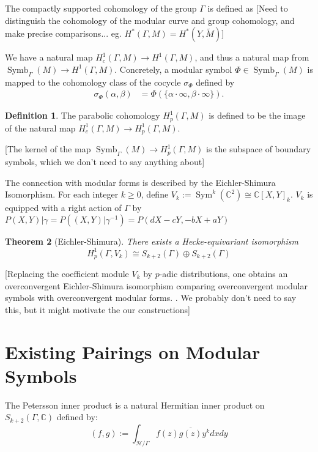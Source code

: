 \documentclass[10pt]{amsart}
\theoremstyle{plain}
\newtheorem{theorem}{Theorem}[section]
\theoremstyle{definition}
\newtheorem{definition}[theorem]{Definition}
\newcommand{\CC}{{\mathbb{C}}}
\newcommand{\cH}{\mathcal{H}}
\DeclareMathOperator{\Sym}{Sym}
\DeclareMathOperator{\Symb}{Symb}
\begin{document}
The compactly supported cohomology of the group $\Gamma$ is defined as 
[Need to distinguish the cohomology of the modular curve and group cohomology, and make precise comparisons... eg. $H^*(\Gamma, M) = H^*(Y, \widetilde{M})$]



We have a natural map $H^1_c(\Gamma, M)\longrightarrow H^1(\Gamma,M)$, and thus a natural map from $\Symb_\Gamma(M)\longrightarrow H^1(\Gamma,M)$. Concretely, a modular symbol $\Phi\in \Symb_\Gamma(M)$ is mapped to the cohomology class of the cocycle $\sigma_\Phi$ defined by
\begin{align*}
\sigma_{\Phi}(\alpha, \beta) &= \Phi(\{\alpha \cdot \infty, \beta \cdot \infty\}).%
\end{align*}
\begin{definition}
The parabolic cohomology $H^1_p(\Gamma,M)$ is defined to be the image of the natural map $H^1_c(\Gamma,M)\longrightarrow H^1_p(\Gamma,M)$.
\end{definition}
[The kernel of the map $\Symb_\Gamma(M)\longrightarrow H^1_p(\Gamma,M)$ is the subspace of boundary symbols, which we don't need to say anything about]

The connection with modular forms is described by the Eichler-Shimura Isomorphism. For each integer $k\geq 0$, define $V_k:=\Sym^k(\CC^2)\cong \CC[X,Y]_k$. $V_k$ is equipped with a right action of $\Gamma$ by $P(X,Y)|\gamma =P((X,Y)|\gamma^{-1})=P(dX-cY,-bX+aY)$ %
\begin{theorem}[Eichler-Shimura]
There exists a Hecke-equivariant isomorphism
\begin{equation*}
	H^1_p(\Gamma, V_k) \cong S_{k+2}(\Gamma)\oplus \overline{S_{k+2}(\Gamma)}
\end{equation*}
\end{theorem}

[Replacing the coefficient module $V_k$ by $p$-adic distributions, one obtains an overconvergent Eichler-Shimura isomorphism comparing overconvergent modular symbols with overconvergent modular forms. \cite{Andreatta, Iovita, Stevens}. We probably don't need to say this, but it might motivate the our constructions]

\section{Existing Pairings on Modular Symbols} \label{sec:existing_pairings}
The Petersson inner product is a natural Hermitian inner product on $S_{k+2}(\Gamma,\CC)$ defined by:
\begin{equation*}
	(f,g) := \int_{\cH/\Gamma} f(z) \overline{g(z)} y^{k} dx dy
\end{equation*}
\end{document}
